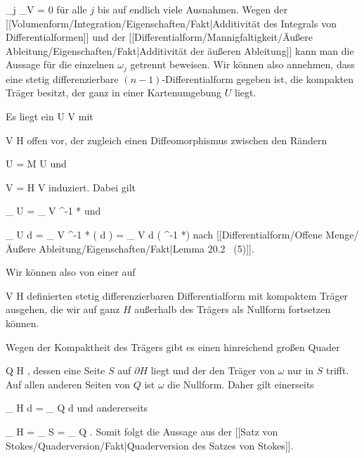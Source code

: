 {{\mavergleichskettedisp
{\vergleichskette
{ \omega_j \vert_V
}
{ =} { 0
}
{ } {
}
{ } {
}
{ } {
}
}
{}{}{}
für alle $j$ bis auf endlich viele Ausnahmen. Wegen der
[[Volumenform/Integration/Eigenschaften/Fakt|Additivität des Integrals von Differentialformen]]
und der
[[Differentialform/Mannigfaltigkeit/Äußere Ableitung/Eigenschaften/Fakt|Additivität der äußeren Ableitung]]
kann man die Aussage für die einzelnen $\omega_j$ getrennt beweisen. Wir können also annehmen, dass eine stetig differenzierbare $(n-1)$-Differentialform gegeben ist, die kompakten Träger besitzt, der ganz in einer Kartenumgebung $U$ liegt.}
{}
\teilbeweis {}{}{}
{Es liegt ein
\maabb {\alpha} { U } { V
} {}
mit

\mavergleichskette
{\vergleichskette
{ V
}
{ \subseteq }{ H
}
{  }{
}
{    }{
}
{   }{
}
}
{}{}{}
offen vor, der zugleich einen Diffeomorphismus zwischen den Rändern

\mavergleichskette
{\vergleichskette
{ \partial U
}
{ = }{ \partial M \cap U
}
{  }{
}
{    }{
}
{   }{
}
}
{}{}{}
und

\mavergleichskette
{\vergleichskette
{ \partial V
}
{ = }{ \partial H \cap V
}
{  }{
}
{    }{
}
{   }{
}
}
{}{}{}
induziert. Dabei gilt

\mavergleichskettedisp
{\vergleichskette
{
\int_{  \partial U  }   \omega
}
{ =} {
\int_{  \partial V  }  \alpha^{-1 *}\omega
}
{ } {
}
{ } {
}
{ } {
}
}
{}{}{}
und

\mavergleichskettedisp
{\vergleichskette
{
\int_{ U  }  d \omega
}
{ =} {
\int_{ V  }  \alpha^{-1 *} (  d \omega)
}
{ =} {
\int_{  V  }  d \left(  \alpha^{-1 *}\omega  \right)
}
{ } {
}
{ } {
}
}
{}{}{}
nach
[[Differentialform/Offene Menge/Äußere Ableitung/Eigenschaften/Fakt|Lemma 20.2  (5)]].}
{\leerzeichen{}Wir können also von einer auf

\mavergleichskette
{\vergleichskette
{ V
}
{ \subseteq }{ H
}
{  }{
}
{    }{
}
{   }{
}
}
{}{}{}
definierten stetig differenzierbaren Differentialform mit kompaktem Träger ausgehen, die wir auf ganz $H$ außerhalb des Trägers als Nullform fortsetzen können.}
\teilbeweis {}{}{}
{Wegen der Kompaktheit des Trägers gibt es einen hinreichend großen Quader

\mavergleichskette
{\vergleichskette
{ Q
}
{ \subseteq }{ H
}
{  }{
}
{    }{
}
{   }{
}
}
{}{}{,}
dessen eine Seite $S$ auf $\partial H$ liegt und der den Träger von $\omega$ nur in $S$ trifft. Auf allen anderen Seiten von $Q$ ist $\omega$
 {} {}
die Nullform. Daher gilt einerseits

\mavergleichskettedisp
{\vergleichskette
{
\int_{ H  }  d\omega
}
{ =} {
\int_{ Q  }  d\omega
}
{ } {
}
{ } {
}
{ } {
}
}
{}{}{}
und andererseits

\mavergleichskettedisp
{\vergleichskette
{
\int_{  \partial H  }   \omega
}
{ =} {
\int_{  S  }   \omega
}
{ =} {
\int_{  \partial Q  }   \omega
}
{ } {
}
{ } {
}
}
{}{}{.}
Somit folgt die Aussage
aus der [[Satz von Stokes/Quaderversion/Fakt|Quaderversion des Satzes von Stokes]].}
{}

}

